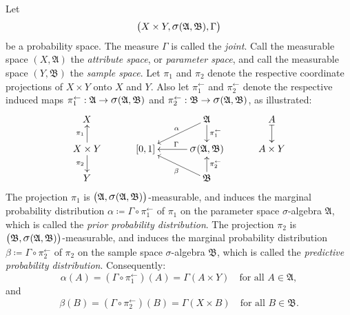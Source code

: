 \documentclass[
twoside=true,
paper=letter,
fontsize=9pt,
pagesize=auto,
leqno,
openany,
headsepline,
overfullrule,
]{scrbook}
\theoremstyle{plain}
\theoremstyle{plain}
\theoremstyle{definition}
\theoremstyle{bfnoteitalic}
\theoremstyle{bfnoteroman}
\newcommand{\sigalg}[1]{\mathfrak{#1}}
\newcommand{\definedby}{\coloneqq}
\newcommand{\sagb}{\mathop{\hbox{\large{$\sigma$}}}\nolimits}
\newcommand{\textsigma}{\hbox{\large{$\sigma$}}\kern-1pt}
\newcommand{\preimage}[1]{#1^{\leftarrow}}
\newcommand{\productsig}[2]{\sagb(#1,#2)}
\newcommand{\measurespace}{X}
\newcommand{\measurespaceii}{Y}
\newcommand{\seti}{A}
\newcommand{\projectionone}{\pi_1}
\newcommand{\projectiontwo}{\pi_2}
\newcommand{\pspace}{\measurespace}%
\newcommand{\sspace}{\measurespaceii}%
\newcommand{\pspaceset}{A}
\newcommand{\sspaceset}{B}
\newcommand{\sspacesig}{\sigalg{B}}
\newcommand{\pspacesig}{\sigalg{A}}
\newcommand{\measonprod}{\Gamma}%
\newcommand{\marginalone}{\alpha}%
\newcommand{\marginaltwo}{\beta}%
\newcommand{\prior}{\marginalone}
\newcommand{\predictive}{\marginaltwo}
\begin{document}
Let
\[
\bigl(\pspace\times\sspace,
\productsig{\pspacesig}{\sspacesig}, 
\measonprod\bigr)
\]
be a probability space.
The measure $\measonprod$ is called the \emph{joint}.
Call the measurable space $(\pspace, \pspacesig)$ the \emph{attribute space}, or \emph{parameter space}, and call the measurable space
$(\sspace, \sspacesig)$ the 
\emph{sample space}.
Let $\projectionone$ and $\projectiontwo$ denote the respective coordinate projections of 
$\pspace\times\sspace$ onto $\pspace$ and $\sspace$. Also let $\preimage{\projectionone}$ and 
$\preimage{\projectiontwo}$ denote the respective induced maps 
$\preimage{\projectionone}:\pspacesig\to\productsig{\pspacesig}{\sspacesig}$
and 
$\preimage{\projectiontwo}:\sspacesig\to\productsig{\pspacesig}{\sspacesig}$, as illustrated:
\[
\xymatrix@R=16pt@C=30pt{ 
\pspace
&
&
\pspacesig 
\ar[d]^-{\preimage{\projectionone}}
\ar[dl]_-{\marginalone}
& \seti \ar@{|->}[d]
\\
\pspace\times\sspace \ar[u]^-{\projectionone} \ar[d]_-{\projectiontwo} &
[0,1] &
\productsig{\pspacesig}{\sspacesig}  \ar[l]_\measonprod
& \seti\times\sspace
\\
\sspace 
&
&
\sspacesig
\ar[u]_-{\preimage{\projectiontwo}}
\ar[ul]^-{\marginaltwo}
\\
}
\]
The projection $\projectionone$ 
is $\bigl(\pspacesig,\productsig{\pspacesig}{\sspacesig}\bigr)$\hyp{}measurable, and
induces the marginal probability distribution
$\marginalone\definedby\measonprod\circ\preimage{\projectionone}$ of $\projectionone$ on the parameter space
\textsigma-algebra $\pspacesig$, 
which is called the \emph{prior probability distribution}.
The projection $\projectiontwo$ 
is $\bigl(\sspacesig,\productsig{\pspacesig}{\sspacesig}\bigr)$\hyp{}measurable, and 
induces the marginal probability distribution
$\marginaltwo\definedby\measonprod\circ\preimage{\projectiontwo}$ of $\projectiontwo$ on the sample space
\textsigma-algebra $\sspacesig$, 
which is called the \emph{predictive probability distribution}.
Consequently:
\[
\prior(\pspaceset) 
= ( \measonprod\circ\preimage{\projectionone} ) (\pspaceset)
= \measonprod(\pspaceset\times\sspace)
\quad \text{for all $\pspaceset\in\pspacesig$},
\]
and
\[
\predictive(\sspaceset) 
= ( \measonprod\circ\preimage{\projectiontwo} ) (\sspaceset)
= \measonprod(\pspace\times\sspaceset)
\quad \text{for all $\sspaceset\in\sspacesig$}.
\]
\end{document}
